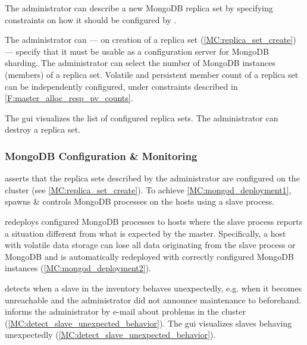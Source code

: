 \begin{description}
	 The administrator can describe a new MongoDB replica set by specifying constraints on 
	how it should be configured by \mamid. \done
	\begin{description}
		 The administrator can --- on creation of a replica set 
		(\ref{MC:replica_set_create}) --- specify that it must be usable as a configuration server for MongoDB sharding. 
		\done
		 The administrator can select the number of MongoDB instances (members) of a 
		replica set. \done
		 Volatile and persistent member count of a replica set can be independently 
		configured, under constraints described in \ref{F:master_alloc_resp_pv_counts}. \done
	\end{description}
	 The gui visualizes the list of configured replica sets. \done
	 The administrator can destroy a replica set. \done
	
\end{description}

\subsubsection{MongoDB Configuration \& Monitoring}
\begin{description}
	 \mamid asserts that the replica sets described by the administrator are configured on the cluster 
	(see \ref{MC:replica_set_create}). \done
	 To achieve \ref{MC:mongod_deployment1}, \mamid spawns \& controls MongoDB processes on the hosts 
	using a slave process. \done
	\begin{description}
		 \mamid redeploys configured MongoDB processes to hosts where the slave process reports 
		a situation different from what is expected by the master. \done
		 Specifically, a host with volatile data storage can lose all data originating 
		from the slave process or MongoDB and is automatically redeployed with correctly configured MongoDB instances 
		(\ref{MC:mongod_deployment2}). \done
	\end{description}
	
	 \mamid detects when a slave in the inventory behaves unexpectedly, e.g. when 
	it becomes unreachable and the administrator did not announce maintenance to \mamid beforehand. \done
	 \mamid informs the administrator by e-mail about problems in the cluster 
	(\ref{MC:detect_slave_unexpected_behavior}). \done
	 The gui visualizes slaves behaving unexpectedly (\ref{MC:detect_slave_unexpected_behavior}). \done
\end{description}

